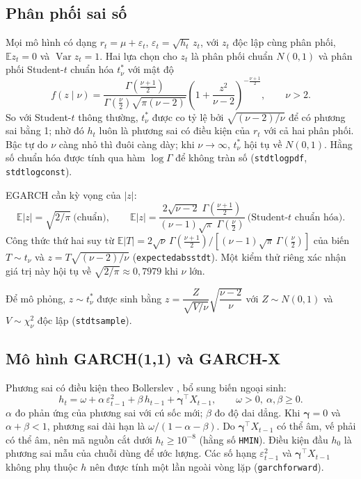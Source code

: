 \documentclass[11pt,a4paper]{article}
\renewcommand{\_}{\gachduoi\allowbreak}
\newcommand{\tep}[1]{\texttt{#1}}
\newcommand{\ham}[1]{\texttt{#1}}
\DeclareMathOperator{\Var}{Var}
\newcommand{\E}{\mathbb{E}}
\newcommand{\bgamma}{\boldsymbol\gamma}
\begin{document}
\subsection{Phân phối sai số}\label{sec:phan-phoi}
Mọi mô hình có dạng $r_t=\mu+\varepsilon_t$, $\varepsilon_t=\sqrt{h_t}\,z_t$, với $z_t$ độc lập cùng phân phối, $\E z_t=0$ và $\Var z_t=1$. Hai lựa chọn cho $z_t$ là phân phối chuẩn $N(0,1)$ và phân phối Student-$t$ chuẩn hóa $t^*_\nu$ với mật độ
\begin{equation}\label{eq:student}
f(z\mid\nu)=\frac{\Gamma\!\left(\frac{\nu+1}{2}\right)}{\Gamma\!\left(\frac{\nu}{2}\right)\sqrt{\pi(\nu-2)}}
\left(1+\frac{z^2}{\nu-2}\right)^{-\frac{\nu+1}{2}},\qquad \nu>2 .
\end{equation}
So với Student-$t$ thông thường, $t^*_\nu$ được co tỷ lệ bởi $\sqrt{(\nu-2)/\nu}$ để có phương sai bằng 1; nhờ đó $h_t$ luôn là phương sai có điều kiện của $r_t$ với cả hai phân phối. Bậc tự do $\nu$ càng nhỏ thì đuôi càng dày; khi $\nu\to\infty$, $t^*_\nu$ hội tụ về $N(0,1)$. Hằng số chuẩn hóa được tính qua hàm $\log\Gamma$ để không tràn số (\ham{std\_t\_logpdf}, \ham{std\_t\_log\_const}).

EGARCH cần kỳ vọng của $|z|$:
\begin{equation}\label{eq:eabsz}
\E|z| = \sqrt{2/\pi}\ \text{(chuẩn)},\qquad
\E|z| = \frac{2\sqrt{\nu-2}\;\Gamma\!\left(\frac{\nu+1}{2}\right)}{(\nu-1)\sqrt{\pi}\;\Gamma\!\left(\frac{\nu}{2}\right)}\ \text{(Student-$t$ chuẩn hóa)} .
\end{equation}
Công thức thứ hai suy từ $\E|T|=2\sqrt\nu\,\Gamma(\frac{\nu+1}{2})/[(\nu-1)\sqrt\pi\,\Gamma(\frac\nu2)]$ của biến $T\sim t_\nu$ và $z=T\sqrt{(\nu-2)/\nu}$ (\ham{expected\_abs\_std\_t}). Một kiểm thử riêng xác nhận giá trị này hội tụ về $\sqrt{2/\pi}\approx0{,}7979$ khi $\nu$ lớn.

Để mô phỏng, $z\sim t^*_\nu$ được sinh bằng $z=\dfrac{Z}{\sqrt{V/\nu}}\sqrt{\dfrac{\nu-2}{\nu}}$ với $Z\sim N(0,1)$ và $V\sim\chi^2_\nu$ độc lập (\ham{std\_t\_sample}).

\subsection{Mô hình GARCH(1,1) và GARCH-X}
Phương sai có điều kiện theo Bollerslev \cite{bollerslev1986}, bổ sung biến ngoại sinh:
\begin{equation}\label{eq:garch}
h_t=\omega+\alpha\,\varepsilon_{t-1}^2+\beta\,h_{t-1}+\bgamma^{\!\top}X_{t-1},\qquad \omega>0,\ \alpha,\beta\ge0 .
\end{equation}
$\alpha$ đo phản ứng của phương sai với cú sốc mới; $\beta$ đo độ dai dẳng. Khi $\bgamma=0$ và $\alpha+\beta<1$, phương sai dài hạn là $\omega/(1-\alpha-\beta)$. Do $\bgamma^{\!\top}X_{t-1}$ có thể âm, vế phải có thể âm, nên mã nguồn cắt dưới $h_t\ge10^{-8}$ (hằng số \tep{H\_MIN}). Điều kiện đầu $h_0$ là phương sai mẫu của chuỗi dùng để ước lượng. Các số hạng $\varepsilon_{t-1}^2$ và $\bgamma^{\!\top}X_{t-1}$ không phụ thuộc $h$ nên được tính một lần ngoài vòng lặp (\ham{garch\_forward}).
\end{document}
